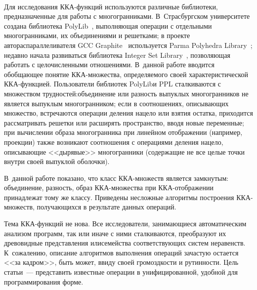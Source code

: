 \begin{multicols}{2}
\begin{figure*}[b] %
\vspace*{-4pt}
 \begin{center}
 \mbox{%
 \epsfxsize=118.522mm
 }
 \end{center}
 \vspace*{-11pt}
\label{zavisimosti}
\end{figure*}

Для исследования ККА-функ\-ций используются различные библиотеки,
предназначенные для работы с многогранниками. В~Страсбургском
университете создана библиотека PolyLib~\cite{PolyLib}, выполняющая
операции с отдельными многогранниками, их объединениями и решетками;
в проекте автораспараллеливателя GCC Graphite~\cite{Graphite}
используется Parma Polyhedra Library~\cite{PPL}; недавно начала
развиваться библиотека Integer Set Library~\cite{ISL}, позволяющая
работать с целочисленными отношениями. В~данной работе вводится
обобщающее понятие ККА-мно\-же\-ст\-ва, определяемого своей
характеристической ККА-функ\-ци\-ей. Пользователи библиотек PolyLib\linebreak и
PPL сталкиваются с множеством трудностей:\linebreak объединение или разность
выпуклых многогранников не является выпуклым многогранником; если в
соотношениях, описывающих множество, встречаются операции деления
нацело или взятия остатка, приходится рассматривать решетки или
расширять пространство, вводя новые переменные; при вы\-чис\-ле\-нии
образа многогранника при линейном отображении (например, проекции)
также возникают соотношения с операциями деления нацело, описывающие
<<дырявые>> многогранники (содержащие не все целые точки внутри
своей выпуклой оболочки). 

В~данной работе показано, что класс
ККА-мно\-жеств является замкнутым: объединение, разность, образ
ККА-мно\-же\-ст\-ва при ККА-отобра\-же\-нии принадлежат тому же классу.
Приведены несложные алгоритмы построения ККА-мно\-жеств, получающихся
в результате данных операций.

Тема ККА-функций не нова. Все исследователи,  занимающиеся
автоматическим анализом программ, так или иначе с ними сталкиваются,
преобразуют их древовидные представления или\linebreak семейства
соответствующих систем неравенств. К~сожалению, описание алгоритмов
выполнения операций зачастую остается <<за кадром>>, быть может,
ввиду своей громоздкости и рутинности. Цель \mbox{статьи}~--- представить
известные операции в унифицированной, удобной для программирования\linebreak
форме.


\end{multicols}
